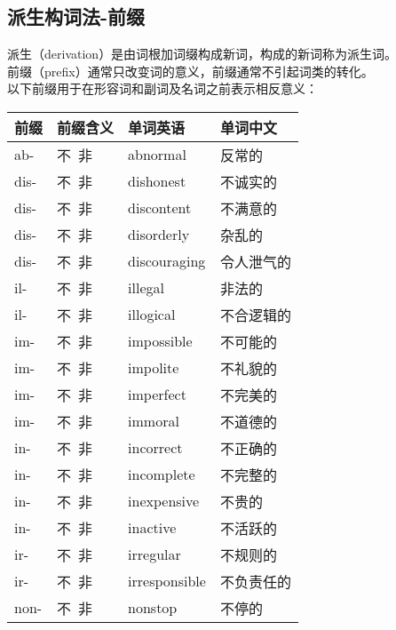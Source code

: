 \documentclass[UTF8]{ctexart}
\begin{document}
\subsection{派生构词法-前缀}
    派生（{\ttfamily derivation}）是由词根加词缀构成新词，构成的新词称为派生词。\\[3mm]
    前缀（{\ttfamily prefix}）通常只改变词的意义，前缀通常不引起词类的转化。\\[3mm]
    以下前缀用于在形容词和副词及名词之前表示相反意义：\vspace{5pt}
    \begin{table}[h!]
        \begin{center}
            \ttfamily
            \begin{tabular}{p{40pt}|p{80pt}|p{100pt}|p{100pt}}
                \hline
                前缀&前缀含义&单词英语&单词中文\\ \hline
                ab-&不~非&abnormal&反常的\\ \hline
                dis-&不~非&dishonest&不诚实的\\ \hline
                dis-&不~非&discontent&不满意的\\ \hline
                dis-&不~非&disorderly&杂乱的\\ \hline
                dis-&不~非&discouraging&令人泄气的\\ \hline
                il-&不~非&illegal&非法的\\ \hline
                il-&不~非&illogical&不合逻辑的\\ \hline
                im-&不~非&impossible&不可能的\\ \hline
                im-&不~非&impolite&不礼貌的\\ \hline
                im-&不~非&imperfect&不完美的\\ \hline
                im-&不~非&immoral&不道德的\\ \hline
                in-&不~非&incorrect&不正确的\\ \hline
                in-&不~非&incomplete&不完整的\\ \hline
                in-&不~非&inexpensive&不贵的\\ \hline
                in-&不~非&inactive&不活跃的\\ \hline
                ir-&不~非&irregular&不规则的\\ \hline
                ir-&不~非&irresponsible&不负责任的\\ \hline
                non-&不~非&nonstop&不停的\\ \hline

\end{tabular}
\end{center}
\end{table}
\end{document}
